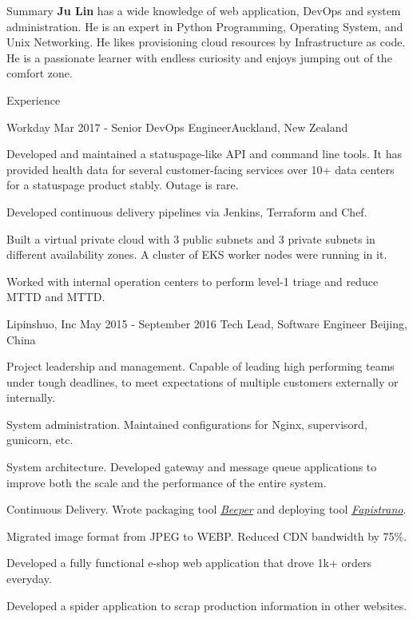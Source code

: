 \documentclass{resume}
\begin{document}
  \begin{rSection}{Summary}
    { {\bf Ju Lin } has a wide knowledge of web application, DevOps and system administration. He is an expert in Python Programming, Operating System, and Unix Networking. He likes provisioning cloud resources by Infrastructure as code. He is a passionate learner with endless curiosity and enjoys jumping out of the comfort zone. }
  \end{rSection}

  \begin{rSection}{Experience}

    \begin{rSubsection}{Workday}{ Mar 2017 - }{Senior DevOps Engineer}{Auckland, New Zealand}
    \item Developed and maintained a statuspage-like API and command line tools. It has provided health data for several customer-facing services over 10+ data centers for a statuspage product stably. Outage is rare.
    \item Developed continuous delivery pipelines via Jenkins, Terraform and Chef.
    \item Built a virtual private cloud with 3 public subnets and 3 private subnets in different availability zones. A cluster of EKS worker nodes were running in it.
    \item Worked with internal operation centers to perform level-1 triage and reduce MTTD and MTTD.
    \end{rSubsection}

    \begin{rSubsection}{Lipinshuo, Inc}{ May 2015 - September 2016 }{Tech Lead, Software Engineer }{Beijing, China}
    \item Project leadership and management. Capable of leading high performing teams under tough deadlines, to meet expectations of multiple customers externally or internally.
    \item System administration. Maintained configurations for Nginx, supervisord, gunicorn, etc.
    \item System architecture. Developed gateway and message queue applications to improve both the scale and the performance of the entire system.
    \item Continuous Delivery. Wrote packaging tool \href{https://github.com/soasme/beeper.py}{\textit{Beeper}} and deploying tool \href{https://github.com/liwushuo/fapistrano}{\textit{Fapistrano}}.
    \item Migrated image format from JPEG to WEBP. Reduced CDN bandwidth by 75\%.
    \item Developed a fully functional e-shop web application that drove 1k+ orders everyday.
    \item Developed a spider application to scrap production information in other websites.
    \end{rSubsection}


\end{rSection}
\end{document}
